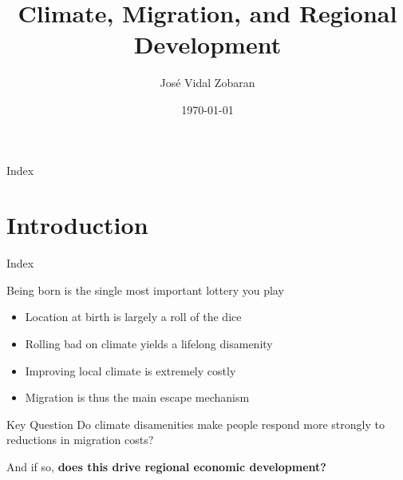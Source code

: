\documentclass[aspectratio=169]{beamer}
\title[Research Proposal Env Econ]{Climate, Migration, and Regional Development}
\author{José Vidal Zobaran}
\institute{FGV-EPGE}
\date{\today}
\begin{document}
\begin{frame}
  \titlepage
\end{frame}

\begin{frame}{Index}
\tableofcontents
\end{frame}

\section{Introduction}
\begin{frame}{Index}
\tableofcontents[currentsection]
\end{frame}

\begin{frame}{Being born is the single most important lottery you play}
\begin{itemize}
    \item Location at birth is largely a roll of the dice
    \item Rolling bad on climate yields a lifelong disamenity
    \item Improving local climate is extremely costly
    \item Migration is thus the main escape mechanism
\end{itemize}
\vspace{0.5em}
\begin{block}{Key Question}
Do climate disamenities make people respond more strongly to reductions in migration costs?
\end{block}
\vspace{0.3em}
\begin{center}
And if so, \textbf{does this drive regional economic development?}
\end{center}
\end{frame}
\end{document}

